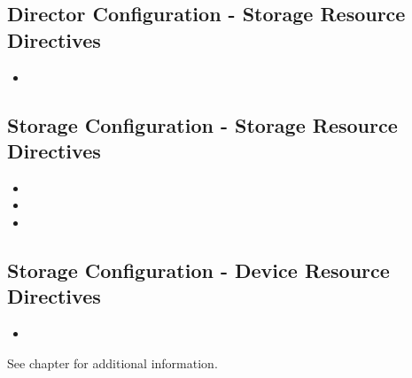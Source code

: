 \subsection{Director Configuration - Storage Resource Directives}
\begin{itemize}
  \item {}
\end{itemize}

\subsection{Storage Configuration - Storage Resource Directives}
\begin{itemize}
  \item {}
  \item {}
  \item {}
\end{itemize}

\subsection{Storage Configuration - Device Resource Directives}
\begin{itemize}
  \item {}
\end{itemize}

See chapter  for additional information.
